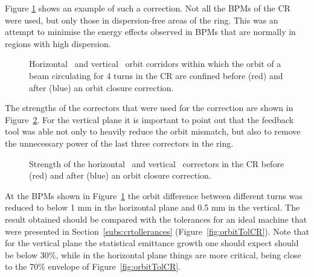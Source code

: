 Figure \ref{fig:orbitCRmatchingMeas} shows an example of such a correction.
Not all the BPMs of the CR were used, but only those in dispersion-free areas of the ring. 
This was an attempt to minimise the energy effects observed in BPMs that are normally in 
regions with high dispersion.
%
\begin{figure}[htbp]
\centering
{}
\qquad
{}
\caption{Horizontal~\protect{} and 
         vertical~\protect{} orbit corridors within which
         the orbit of a beam circulating for 4 turns in the CR are confined before (red) and 
         after (blue) an orbit closure correction.}
\label{fig:orbitCRmatchingMeas}
\end{figure}
%
The strengths of the correctors that were used for the correction 
are shown in Figure~\ref{fig:orbitCRmatchingCorr}.
For the vertical plane it is important to point out that the feedback tool 
was able not only to heavily reduce the orbit mismatch, 
but also to remove the unnecessary power of the last three correctors in the ring. 
%
\begin{figure}[bp]
\centering
{}
\qquad
{}
\caption{Strength of the horizontal~\protect{} and 
         vertical~\protect{} correctors in 
         the CR before (red) and after (blue) an orbit closure correction.}
\label{fig:orbitCRmatchingCorr}
\end{figure}
%
At the BPMs shown in Figure~\ref{fig:orbitCRmatchingMeas} the orbit difference between
different turns was reduced to below 1 mm in the horizontal plane and 0.5 mm in the
vertical.
The result obtained should be compared with the tolerances for an ideal machine that
were presented in Section~\ref{subs:crtollerances} (Figure~\ref{fig:orbitTolCR}).
Note that for the vertical plane the statistical emittance growth one should expect
should be below 30\%, while in the horizontal plane things are more critical, being
close to the 70\% envelope of Figure~\ref{fig:orbitTolCR}.

